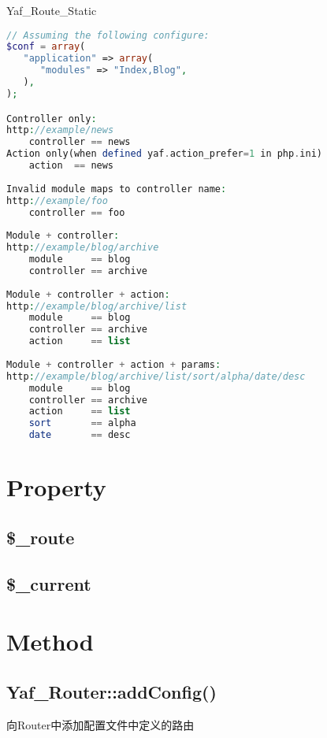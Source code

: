 \begin{example}
Yaf\_Route\_Static
\begin{lstlisting}[language=PHP]
// Assuming the following configure:
$conf = array(
   "application" => array(
      "modules" => "Index,Blog",
   ),
);

Controller only:
http://example/news
    controller == news
Action only(when defined yaf.action_prefer=1 in php.ini)
    action  == news
 
Invalid module maps to controller name:
http://example/foo
    controller == foo
 
Module + controller:
http://example/blog/archive
    module     == blog
    controller == archive
 
Module + controller + action:
http://example/blog/archive/list
    module     == blog
    controller == archive
    action     == list
 
Module + controller + action + params:
http://example/blog/archive/list/sort/alpha/date/desc
    module     == blog
    controller == archive
    action     == list
    sort       == alpha
    date       == desc
\end{lstlisting}
\end{example}


\section{Property}


\subsection{\$\_route}


\subsection{\$\_current}


\section{Method}


\subsection{Yaf\_Router::addConfig()}


向Router中添加配置文件中定义的路由







